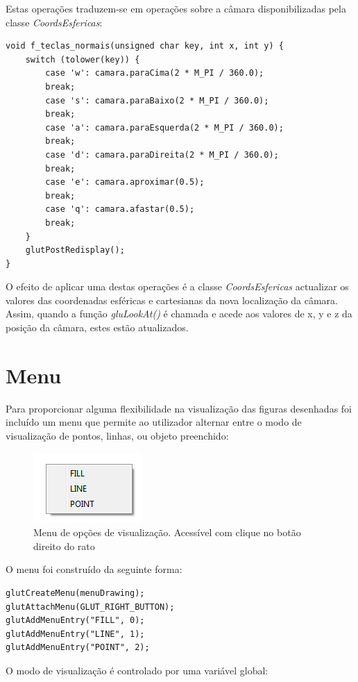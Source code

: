 Estas operações traduzem-se em operações sobre a câmara disponibilizadas pela classe \textit{CoordsEsfericas}:

\begin{Verbatim}
void f_teclas_normais(unsigned char key, int x, int y) {
	switch (tolower(key)) {
		case 'w': camara.paraCima(2 * M_PI / 360.0);  
		break;
		case 's': camara.paraBaixo(2 * M_PI / 360.0); 
		break;
		case 'a': camara.paraEsquerda(2 * M_PI / 360.0);  
		break;
		case 'd': camara.paraDireita(2 * M_PI / 360.0); 
		break;
		case 'e': camara.aproximar(0.5);
		break;
		case 'q': camara.afastar(0.5);
		break;
	}
	glutPostRedisplay();
}
\end{Verbatim}

O efeito de aplicar uma destas operações é a classe \textit{CoordsEsfericas} actualizar os valores das coordenadas esféricas e cartesianas da nova localização da câmara. Assim, quando a função \textit{gluLookAt()} é chamada e acede aos valores de x, y e z da posição da câmara, estes estão atualizados.

\section{Menu}

Para proporcionar alguma flexibilidade na visualização das figuras desenhadas foi incluído um menu que permite ao utilizador alternar entre o modo de visualização de pontos, linhas, ou objeto preenchido:

\begin{figure}[<+htpb+>]
	\centering
	\includegraphics[scale=1.0]{imagens/p1_menuOpcoes.png}
	\caption{Menu de opções de visualização. Acessível com clique no botão direito do rato}
	\label{p1:fig:p1_menuOpcoes}
\end{figure}

O menu foi construído da seguinte forma:

\begin{Verbatim}
glutCreateMenu(menuDrawing);
glutAttachMenu(GLUT_RIGHT_BUTTON);
glutAddMenuEntry("FILL", 0);
glutAddMenuEntry("LINE", 1);
glutAddMenuEntry("POINT", 2);
\end{Verbatim}

O modo de visualização é controlado por uma variável global:

